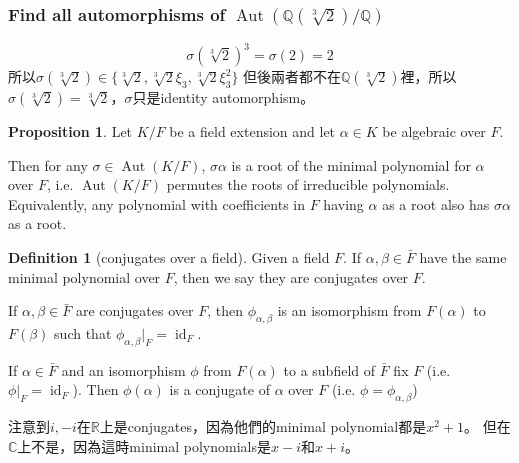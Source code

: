 \documentclass{article}
\theoremstyle{definition}
\newtheorem{dfn}{Definition}
\newtheorem{prop}{Proposition}
\newcommand{\CC}{\mathbb C}
\newcommand{\QQ}{\mathbb Q}
\newcommand{\RR}{\mathbb R}
\DeclareMathOperator{\Aut}{Aut}
\DeclareMathOperator{\id}{id}
\begin{document}
\subsubsection*{Find all automorphisms of $\Aut(\QQ(\sqrt[3]{2})/\QQ)$}
\[\sigma(\sqrt[3]{2})^3=\sigma(2)=2\]
所以$\sigma(\sqrt[3]{2})\in \{\sqrt[3]{2},\sqrt[3]{2}\xi_3, \sqrt[3]{2}\xi_3^2\}$
但後兩者都不在$\QQ(\sqrt[3]{2})$裡，所以$\sigma(\sqrt[3]{2})=\sqrt[3]{2}$，$\sigma$只是identity automorphism。

\begin{prop}
	Let $K/F$ be a field extension and let $\alpha\in K$ be algebraic over $F$.

	Then for any $\sigma\in\Aut(K/F)$, $\sigma\alpha$ is a root of the minimal polynomial for $\alpha$ over $F$, 
	i.e. $\Aut(K/F)$ permutes the roots of irreducible polynomials. Equivalently, any polynomial with coefficients in $F$ having $\alpha$ as a root also has $\sigma\alpha$ as a root.
\end{prop}


\begin{dfn}[conjugates over a field]
	Given a field $F$. 
	If $\alpha,\beta\in\bar{F}$
	have the same minimal polynomial over $F$, then
	we say they are conjugates over $F$.
\end{dfn}

If $\alpha,\beta\in \bar{F}$ are conjugates over $F$, then $\phi_{\alpha,\beta}$ is an isomorphism from $F(\alpha)$ to $F(\beta)$ such that $\phi_{\alpha,\beta}|_F=\id_F$.

If $\alpha\in \bar{F}$ and an isomorphism $\phi$ from $F(\alpha)$ to a subfield of $\bar{F}$ fix $F$ (i.e. $\phi|_F=\id_F$).
Then $\phi(\alpha)$ is a conjugate of $\alpha$ over $F$ (i.e. $\phi=\phi_{\alpha,\beta}$)



注意到$i,-i$在$\RR$上是conjugates，因為他們的minimal polynomial都是$x^2+1$。
但在$\CC$上不是，因為這時minimal polynomials是$x-i$和$x+i$。
\end{document}
